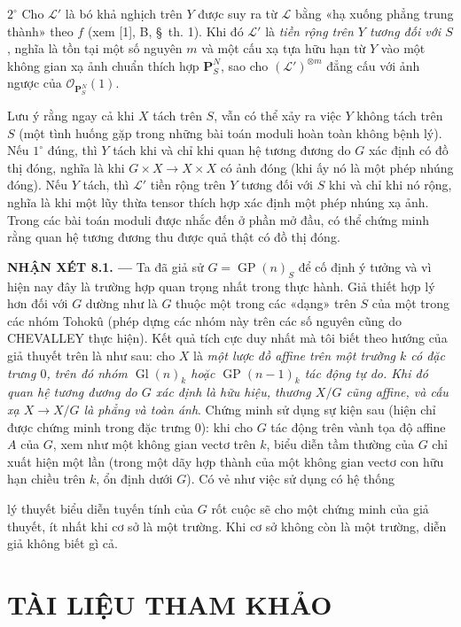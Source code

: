 \documentclass[11pt,twoside,openany]{book}
\numberwithin{equation}{section}
\newcommand{\src}[1]{%
  \phantomsection\hypertarget{src:\fgasourceid:#1}{}%
  \marginpar{\raggedleft\footnotesize\sffamily #1}%
}
\newcommand{\fgasourceid}{unset}
\begin{document}
\smallskip
\noindent $2^\circ$ Cho $\mathcal L'$ là bó khả nghịch trên $Y$ được suy ra
từ $\mathcal L$ bằng «hạ xuống phẳng trung thành» theo $f$ (xem [1], B,
\S~th. 1). Khi đó $\mathcal L'$ là \emph{tiền rộng trên $Y$ tương đối với
$S$}, nghĩa là tồn tại một số nguyên $m$ và một cấu xạ tựa hữu hạn từ $Y$ vào
một không gian xạ ảnh chuẩn thích hợp $\mathbf P_S^N$, sao cho
$(\mathcal L')^{\otimes m}$ đẳng cấu với ảnh ngược của
$\mathcal O_{\mathbf P_S^N}(1)$.

Lưu ý rằng ngay cả khi $X$ tách trên $S$, vẫn có thể xảy ra việc $Y$ không
tách trên $S$ (một tình huống gặp trong những bài toán moduli hoàn toàn không
bệnh lý). Nếu $1^\circ$ đúng, thì $Y$ tách khi và chỉ khi quan hệ tương đương
do $G$ xác định có đồ thị đóng, nghĩa là khi $G\times X\to X\times X$ có ảnh
đóng (khi ấy nó là một phép nhúng đóng). Nếu $Y$ tách, thì $\mathcal L'$ tiền
rộng trên $Y$ tương đối với $S$ khi và chỉ khi nó rộng, nghĩa là khi một lũy
thừa tensor thích hợp xác định một phép nhúng xạ ảnh. Trong các bài toán moduli
được nhắc đến ở phần mở đầu, có thể chứng minh rằng quan hệ tương đương thu
được quả thật có đồ thị đóng.

\medskip
\noindent\textbf{NHẬN XÉT 8.1. ---} Ta đã giả sử
$G=\operatorname{GP}(n)_S$ để cố định ý tưởng và vì hiện nay đây là trường hợp
quan trọng nhất trong thực hành. Giả thiết hợp lý hơn đối với $G$ dường như là
$G$ thuộc một trong các «dạng» trên $S$ của một trong các nhóm Tohokû (phép
dựng các nhóm này trên các số nguyên cũng do CHEVALLEY thực hiện). Kết quả tích
cực duy nhất mà tôi biết theo hướng của giả thuyết trên là như sau: cho $X$ là
\emph{một lược đồ affine trên một trường $k$ có đặc trưng $0$, trên đó nhóm
$\operatorname{Gl}(n)_k$ hoặc $\operatorname{GP}(n-1)_k$ tác động tự do. Khi
đó quan hệ tương đương do $G$ xác định là hữu hiệu, thương $X/G$ cũng affine,
và cấu xạ $X\to X/G$ là phẳng và toàn ánh}. Chứng minh sử dụng sự kiện sau
(hiện chỉ được chứng minh trong đặc trưng $0$): khi cho $G$ tác động trên vành
tọa độ affine $A$ của $G$, xem như một không gian vectơ trên $k$, biểu diễn tầm
thường của $G$ chỉ xuất hiện một lần (trong một dãy hợp thành của một không
gian vectơ con hữu hạn chiều trên $k$, ổn định dưới $G$). Có vẻ như việc sử
dụng có hệ thống
\src{118}
lý thuyết biểu diễn tuyến tính của $G$ rốt cuộc sẽ cho một chứng minh của
giả thuyết, ít nhất khi cơ sở là một trường. Khi cơ sở không còn là một trường,
diễn giả không biết gì cả.

\section*{TÀI LIỆU THAM KHẢO}
\end{document}
